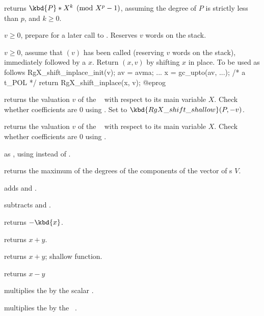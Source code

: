  returns $\kbd{P} * X^k
\pmod {X^p-1}$, assuming the degree of $P$ is strictly less than $p$, and
$k\geq 0$.

 $v \geq 0$, prepare for a later
call to . Reserves $v$ words on the stack.

 $v \geq 0$, assume that
$(v)$ has been called (reserving $v$ words on the
stack), immediately followed by a  $x$. Return $(x,v)$
by shifting $x$ in place. To be used as follows
\bprog
  RgX_shift_inplace_init(v);
  av = avma;
  ...
  x = gc_upto(av, ...); /* a t_POL */
  return RgX_shift_inplace(x, v);
@eprog

 returns the valuation $v$ of the
~ with respect to its main variable $X$. Check whether
coefficients are $0$ using . Set  to
$\kbd{RgX\_shift\_shallow}(P,-v)$.

 returns the valuation $v$ of the
~ with respect to its main variable $X$. Check whether
coefficients are $0$ using .

 as , using
 instead of .

 returns the maximum of the degrees of
the components of the vector of s $V$.


 adds  and .

 subtracts  and .

 returns $-\kbd{x}$.

 returns $x+y$.

 returns $x+y$; shallow function.


 returns $x-y$

 multiplies the  
by the scalar .

 multiplies the  
by the ~.

